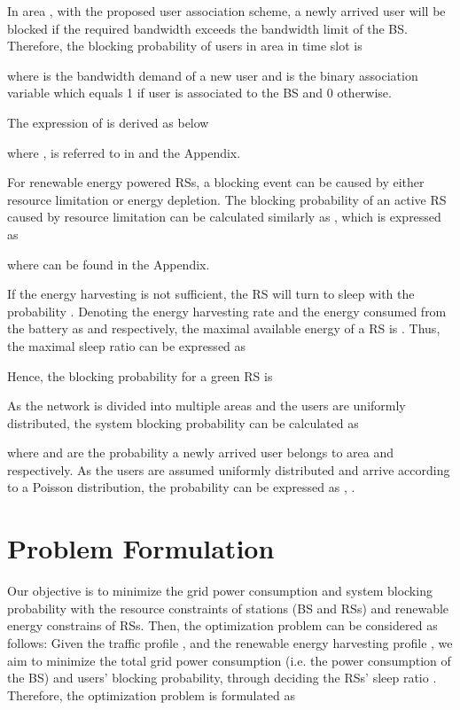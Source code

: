\documentclass[conference]{IEEEtran}
\begin{document}
 In area , with the proposed user association scheme, a newly arrived user will be blocked if the required bandwidth exceeds the bandwidth limit of the BS. Therefore, the blocking probability of users in area  in time slot  is
 
 where  is the bandwidth demand of a new user  and  is the binary association variable which equals 1 if user  is associated to the BS and 0 otherwise.

 The expression of  is derived as below
 
 where ,  is referred to in \cite{Jie2012Adynamic} and the Appendix.


  For renewable energy powered RSs, a blocking event can be caused by either resource limitation or energy depletion. The blocking probability of an active RS caused by resource limitation  can be calculated similarly as , which is expressed as
  
  where  can be found in the Appendix.

  If the energy harvesting is not sufficient, the RS will turn to sleep with the  probability . Denoting the energy harvesting rate and the energy consumed from the battery as  and  respectively, the maximal available energy of a RS is  \cite{Jie2014Base}. Thus, the maximal sleep ratio can be expressed as
  

  Hence, the blocking probability for a green RS is
  

  As the network is divided into multiple areas and the users are uniformly distributed, the system blocking probability can be calculated as
  
  where  and  are the probability a newly arrived user belongs to area  and  respectively. As the users are assumed uniformly distributed and arrive according to a Poisson distribution, the probability can be expressed as , .


 \section{Problem Formulation}\label{sec:formulation}
 Our objective is to minimize the grid power consumption and system blocking probability with the resource constraints of stations (BS and RSs) and renewable energy constrains of RSs.
Then, the optimization problem can be considered as follows: Given the traffic profile ,  and the renewable energy harvesting profile , we aim to minimize the total grid power consumption (i.e. the power consumption of the BS) and users' blocking probability, through deciding the RSs' sleep ratio . Therefore, the optimization problem is formulated as
 
\end{document}
